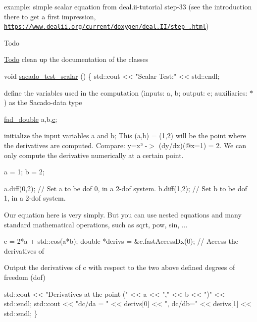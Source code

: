 \begin{DoxyEnumerate}
\item example\+: simple scalar equation from deal.\+ii-\/tutorial step-\/33 (see the introduction there to get a first impression, \href{https://www.dealii.org/current/doxygen/deal.II/step_33.html}{\tt https\+://www.\+dealii.\+org/current/doxygen/deal.\+I\+I/step\+\_.\+html}) \begin{DoxyRefDesc}{Todo}
\item[\hyperlink{todo__todo000004}{Todo}]clean up the documentation of the classes\end{DoxyRefDesc}

\end{DoxyEnumerate}


\begin{DoxyCode}
\textcolor{keywordtype}{void} \hyperlink{Sacado__example_8cc_a71b2675e62203edc430e7ffc8a365193}{sacado\_test\_scalar} ()
\{
    std::cout << \textcolor{stringliteral}{"Scalar Test:"} << std::endl;
\end{DoxyCode}
 define the variables used in the computation (inputs\+: a, b; output\+: c; auxiliaries\+: $\ast$) as the Sacado-\/data type 
\begin{DoxyCode}
\hyperlink{Sacado__example_8cc_a868b94676739e612d9c95940e70892a9}{fad\_double} a,b,\hyperlink{CMakeCache_8txt_aac1d6a1710812201527c735f7c6afbaa}{c};
\end{DoxyCode}
 initialize the input variables a and b; This (a,b) = (1,2) will be the point where the derivatives are computed. Compare\+: y=x² -\/$>$ (dy/dx)(@x=1) = 2. We can only compute the derivative numerically at a certain point. 
\begin{DoxyCode}
 a = 1;
 b = 2;

a.diff(0,2);  \textcolor{comment}{// Set a to be dof 0, in a 2-dof system.}
b.diff(1,2);  \textcolor{comment}{// Set b to be dof 1, in a 2-dof system.}
\end{DoxyCode}
 Our equation here is very simply. But you can use nested equations and many standard mathematical operations, such as sqrt, pow, sin, ... 
\begin{DoxyCode}
c = 2*a + std::cos(a*b);
\textcolor{keywordtype}{double} *derivs = &c.fastAccessDx(0); \textcolor{comment}{// Access the derivatives of}
\end{DoxyCode}
 Output the derivatives of c with respect to the two above defined degrees of freedom (dof) 
\begin{DoxyCode}
    std::cout << \textcolor{stringliteral}{"Derivatives at the point ("} << a << \textcolor{stringliteral}{","} << b << \textcolor{stringliteral}{")"} << std::endl;
    std::cout << \textcolor{stringliteral}{"dc/da = "} << derivs[0] << \textcolor{stringliteral}{", dc/db="} << derivs[1] << std::endl;
\}
\end{DoxyCode}

